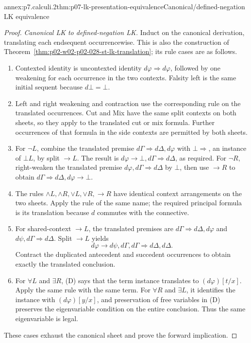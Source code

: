 \begin{annexitem}{annex:p7.calculi.2}{thm:p07-lk-presentation-equivalence}{Canonical/defined-negation LK equivalence}
\begin{proof}
\emph{Canonical LK to defined-negation LK.} Induct on the canonical
derivation, translating each endsequent occurrencewise.  This is also the
construction of Theorem~\ref{thm:p02-w02-p02-028-st-lk-translation}; its
rule cases are as follows.
\begin{enumerate}
\item Contexted identity is uncontexted identity
      \(d\varphi\Rightarrow d\varphi\), followed by one weakening for
      each occurrence in the two contexts.  Falsity left is the same
      initial sequent because \(d\bot=\bot\).
\item Left and right weakening and contraction use the corresponding
      rule on the translated occurrences.  Cut and Mix have the same
      split contexts on both sheets, so they apply to the translated cut
      or mix formula.  Further occurrences of that formula in the side
      contexts are permitted by both sheets.
\item For \(\neg L\), combine the translated premise
      \(d\Gamma\Rightarrow d\Delta,d\varphi\) with
      \(\bot\Rightarrow\), an instance of \(\bot L\), by split
      \(\to L\).  The result is
      \(d\varphi\to\bot,d\Gamma\Rightarrow d\Delta\), as required.
      For \(\neg R\), right-weaken the translated premise
      \(d\varphi,d\Gamma\Rightarrow d\Delta\) by \(\bot\), then
      use \(\to R\) to obtain
      \(d\Gamma\Rightarrow d\Delta,d\varphi\to\bot\).
\item The rules \(\land L,\land R,\lor L,\lor R,\to R\) have
      identical context arrangements on the two sheets.  Apply the rule
      of the same name; the required principal formula is its translation
      because \(d\) commutes with the connective.
\item For shared-context \(\to L\), the translated premises are
      \(d\Gamma\Rightarrow d\Delta,d\varphi\) and
      \(d\psi,d\Gamma\Rightarrow d\Delta\).  Split \(\to L\)
      yields
      \[
       d\varphi\to d\psi,d\Gamma,d\Gamma
       \Rightarrow d\Delta,d\Delta.
      \]
      Contract the duplicated antecedent and succedent occurrences to
      obtain exactly the translated conclusion.
\item For \(\forall L\) and \(\exists R\), (D) says that the term
      instance translates to \((d\varphi)[t/x]\). Apply the same rule
      with the same term. For
      \(\forall R\) and \(\exists L\), it identifies the instance
      with \((d\varphi)[y/x]\), and preservation of free variables
      in (D) preserves the eigenvariable condition on the entire
      conclusion.  Thus the same eigenvariable is legal.
\end{enumerate}
These cases exhaust the canonical sheet and prove the forward implication.


\end{proof}
\end{annexitem}
